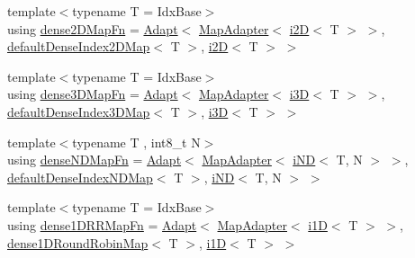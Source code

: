 \begin{DoxyCompactItemize}
{\footnotesize template$<$typename T  = Idx\+Base$>$ }\\using \hyperlink{namespacevt_1_1mapping_afea13b390fab1d1388658ed759f9f44f}{dense2\+D\+Map\+Fn} = \hyperlink{namespacevt_1_1mapping_aafe187035ce8df02f31983e37cdb6a5d}{Adapt}$<$ \hyperlink{namespacevt_1_1mapping_a41b113c28bb6430fbcb5be66e08ccf9f}{Map\+Adapter}$<$ \hyperlink{namespacevt_1_1mapping_a6448c875e0807b43f31e96fc5b0cec04}{i2D}$<$ T $>$ $>$, \hyperlink{namespacevt_1_1mapping_a011c4e2cb832d3edcd98e3803d405ad4}{default\+Dense\+Index2\+D\+Map}$<$ T $>$, \hyperlink{namespacevt_1_1mapping_a6448c875e0807b43f31e96fc5b0cec04}{i2D}$<$ T $>$ $>$
\item 
{\footnotesize template$<$typename T  = Idx\+Base$>$ }\\using \hyperlink{namespacevt_1_1mapping_a4161eb1a3c61249a269654c4529788e0}{dense3\+D\+Map\+Fn} = \hyperlink{namespacevt_1_1mapping_aafe187035ce8df02f31983e37cdb6a5d}{Adapt}$<$ \hyperlink{namespacevt_1_1mapping_a41b113c28bb6430fbcb5be66e08ccf9f}{Map\+Adapter}$<$ \hyperlink{namespacevt_1_1mapping_af435b967b9ed1ccb5ec4effdbd9abd13}{i3D}$<$ T $>$ $>$, \hyperlink{namespacevt_1_1mapping_a776a69138a1fbceab5bbf10b9c07a858}{default\+Dense\+Index3\+D\+Map}$<$ T $>$, \hyperlink{namespacevt_1_1mapping_af435b967b9ed1ccb5ec4effdbd9abd13}{i3D}$<$ T $>$ $>$
\item 
{\footnotesize template$<$typename T , int8\+\_\+t N$>$ }\\using \hyperlink{namespacevt_1_1mapping_a02a4066fb2101421d657a9f601cc9977}{dense\+N\+D\+Map\+Fn} = \hyperlink{namespacevt_1_1mapping_aafe187035ce8df02f31983e37cdb6a5d}{Adapt}$<$ \hyperlink{namespacevt_1_1mapping_a41b113c28bb6430fbcb5be66e08ccf9f}{Map\+Adapter}$<$ \hyperlink{namespacevt_1_1mapping_ad53b53dc14e67437c17cefe9c3c70380}{i\+ND}$<$ T, N $>$ $>$, \hyperlink{namespacevt_1_1mapping_a39633710d765933d6d91b8bb9818fcc7}{default\+Dense\+Index\+N\+D\+Map}$<$ T $>$, \hyperlink{namespacevt_1_1mapping_ad53b53dc14e67437c17cefe9c3c70380}{i\+ND}$<$ T, N $>$ $>$
\item 
{\footnotesize template$<$typename T  = Idx\+Base$>$ }\\using \hyperlink{namespacevt_1_1mapping_a35647c2efdfa50549574fcbd05132dc0}{dense1\+D\+R\+R\+Map\+Fn} = \hyperlink{namespacevt_1_1mapping_aafe187035ce8df02f31983e37cdb6a5d}{Adapt}$<$ \hyperlink{namespacevt_1_1mapping_a41b113c28bb6430fbcb5be66e08ccf9f}{Map\+Adapter}$<$ \hyperlink{namespacevt_1_1mapping_af0c14a9a77e0311b3d089143ed93ba76}{i1D}$<$ T $>$ $>$, \hyperlink{namespacevt_1_1mapping_a2a4e62c5dc17da0032d3953c7e3cde8b}{dense1\+D\+Round\+Robin\+Map}$<$ T $>$, \hyperlink{namespacevt_1_1mapping_af0c14a9a77e0311b3d089143ed93ba76}{i1D}$<$ T $>$ $>$

\end{DoxyCompactItemize}
